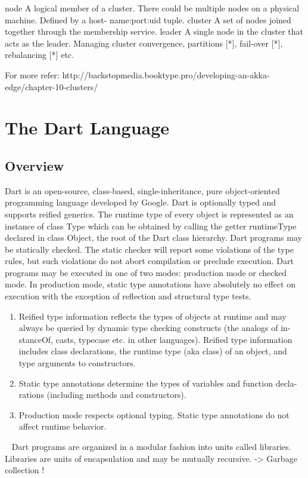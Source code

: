   node A logical member of a cluster. There could be multiple nodes on a physical machine. Defined by a host- name:port:uid tuple.
  cluster A set of nodes joined together through the membership service.
  leader A single node in the cluster that acts as the leader. Managing cluster convergence, partitions [*], fail-over [*], rebalancing [*] etc.

For more refer:
http://backstopmedia.booktype.pro/developing-an-akka-edge/chapter-10-clusters/

\section{The Dart Language}
  \subsection{Overview}
  Dart is an open-source, class-based, single-inheritance, pure object-oriented programming language developed by Google. Dart is optionally typed and supports reified generics. The runtime type of every object is represented as an instance of class Type which can be obtained by calling the getter runtimeType declared in class Object, the root of the Dart class hierarchy.
  Dart programs may be statically checked. The static checker will report some violations of the type rules, but such violations do not abort compilation or preclude execution.
  Dart programs may be executed in one of two modes: production mode or checked mode. In production mode, static type annotations have absolutely no effect on execution with the exception of reflection and structural type tests.
  \begin{enumerate}
  \item Reified type information reflects the types of objects at runtime and may always be queried by dynamic type checking constructs (the analogs of in- stanceOf, casts, typecase etc. in other languages). Reified type information includes class declarations, the runtime type (aka class) of an object, and type arguments to constructors.
  \item Static type annotations determine the types of variables and function decla- rations (including methods and constructors).
  \item Production mode respects optional typing. Static type annotations do not affect runtime behavior.
  \end{enumerate}
~\parencite{dartEcma}
Dart programs are organized in a modular fashion into units called libraries. Libraries are units of encapsulation and may be mutually recursive.
\newline
-> Garbage collection !

